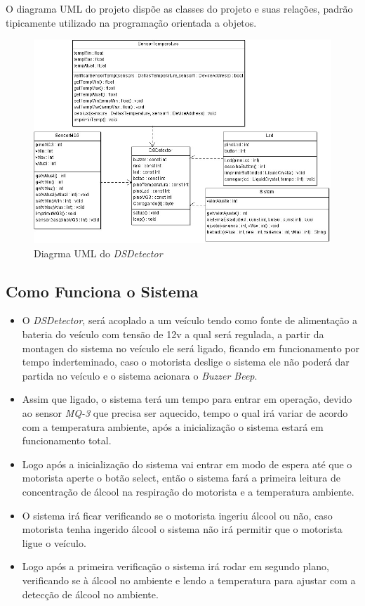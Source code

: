 \documentclass[12pt]{article}
\begin{document}
O diagrama UML do projeto dispõe as classes do projeto e suas relações, padrão tipicamente utilizado na programação orientada a objetos.
\begin{figure}[ht]
\centering
\includegraphics[width=.6\textwidth]{uml.jpg}
\caption{Diagrma UML do \emph{DSDetector}}
\label{fig:exampleFig1}
\end{figure}


\subsection{Como Funciona o Sistema}

\begin{itemize}
    \item O \emph{DSDetector}, será acoplado a um veículo tendo como fonte
de alimentação a bateria do veículo com tensão de 12v a qual
será regulada, a partir da montagen do sistema no veículo ele
será ligado, ficando em funcionamento por tempo
inderteminado, caso o motorista deslige o sistema ele não
poderá dar partida no veículo e o sistema acionara o \emph{Buzzer
Beep}.

\item Assim que ligado, o sistema terá um tempo para entrar em
operação, devido ao sensor \emph{MQ-3} que precisa ser aquecido,
tempo o qual irá variar de acordo com a temperatura
ambiente, após a inicialização o sistema estará em
funcionamento total.
\item Logo após a inicialização do sistema vai entrar em modo de
espera até que o motorista aperte o botão select, então o
sistema fará a primeira leitura de concentração de álcool na
respiração do motorista e a temperatura ambiente.

\item O sistema irá ficar verificando se o motorista ingeriu álcool ou
não, caso motorista tenha ingerido álcool o sistema não irá
permitir que o motorista ligue o veículo.

\item Logo após a primeira verificação o sistema irá rodar em
segundo plano, verificando se à álcool no ambiente e lendo a
temperatura para ajustar com a detecção de álcool no
ambiente.
\end{itemize}
\end{document}
